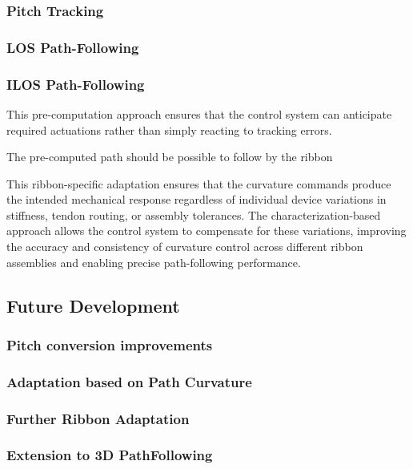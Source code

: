 \subsubsection{Pitch Tracking}

\subsubsection{LOS Path-Following}

\subsubsection{ILOS Path-Following}

This pre-computation approach ensures that the control system can anticipate required actuations rather than simply reacting to tracking errors. 

The pre-computed path should be possible to follow by the ribbon

This ribbon-specific adaptation ensures that the curvature commands produce the intended mechanical response regardless of individual device variations in stiffness, tendon routing, or assembly tolerances. The characterization-based approach allows the control system to compensate for these variations, improving the accuracy and consistency of curvature control across different ribbon assemblies and enabling precise path-following performance.



\subsection{Future Development}

\subsubsection{Pitch conversion improvements}

\subsubsection{Adaptation based on Path Curvature}

\subsubsection{Further Ribbon Adaptation}


\subsubsection{Extension to 3D PathFollowing}





